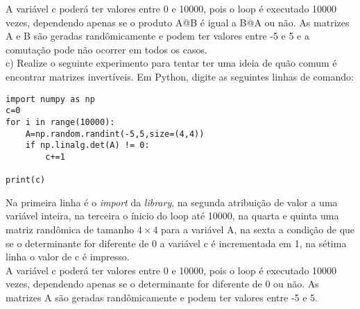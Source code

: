 \textcolor{COLOR2}{A variável c poderá ter valores entre 0 e 10000, pois o loop é executado 10000 vezes, dependendo apenas se o produto A@B é igual a B@A ou não. As matrizes A e B são geradas randômicamente e podem ter valores entre -5 e 5 e a comutação pode não ocorrer em todos os casos.}
\\

c) Realize o seguinte experimento para tentar ter uma ideia de quão comum é encontrar matrizes invertíveis. Em Python, digite as seguintes linhas de comando:
\\

\begin{lstlisting}
import numpy as np
c=0
for i in range(10000):
    A=np.random.randint(-5,5,size=(4,4))
    if np.linalg.det(A) != 0:
        c+=1

print(c)
\end{lstlisting}

Na primeira linha é o \textit{import} da \textit{library}, na segunda atribuição de valor a uma variável inteira, na terceira o ínicio do loop até 10000, na quarta e quinta uma matriz randômica de tamanho $4\times 4$ para a variável A, na sexta a condição de que se o determinante for diferente de 0 a variável c é incrementada em 1, na sétima linha o valor de c é impresso.
\\

\textcolor{COLOR2}{A variável c poderá ter valores entre 0 e 10000, pois o loop é executado 10000 vezes, dependendo apenas se o determinante for diferente de 0 ou não. As matrizes A são geradas randômicamente e podem ter valores entre -5 e 5.}